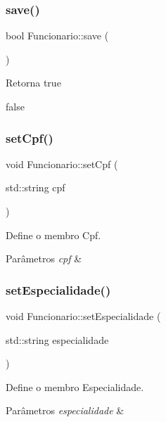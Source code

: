\subsubsection{\texorpdfstring{save()}{save()}}
{\footnotesize\ttfamily bool Funcionario\+::save (\begin{DoxyParamCaption}{ }\end{DoxyParamCaption})}

\begin{DoxyReturn}{Retorna}
true 

false 
\end{DoxyReturn}
\mbox{\label{classFuncionario_a4fd103578189cdce84cd0f76f6c668fd}} 
\subsubsection{\texorpdfstring{set\+Cpf()}{setCpf()}}
{\footnotesize\ttfamily void Funcionario\+::set\+Cpf (\begin{DoxyParamCaption}\item[{std\+::string}]{cpf }\end{DoxyParamCaption})}



Define o membro Cpf. 


\begin{DoxyParams}{Parâmetros}
{\em cpf} & \\
\hline
\end{DoxyParams}
\mbox{\label{classFuncionario_ae412312aaaaceaca6dd132e8397b283f}} 
\subsubsection{\texorpdfstring{set\+Especialidade()}{setEspecialidade()}}
{\footnotesize\ttfamily void Funcionario\+::set\+Especialidade (\begin{DoxyParamCaption}\item[{std\+::string}]{especialidade }\end{DoxyParamCaption})}



Define o membro Especialidade. 


\begin{DoxyParams}{Parâmetros}
{\em especialidade} & \\
\hline
\end{DoxyParams}
\mbox{\label{classFuncionario_aa8a9bab437eb41578fe514f26c16e5d2}} 
